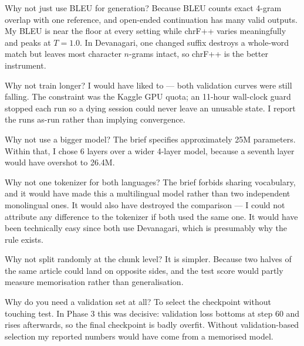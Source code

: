 \documentclass[11pt]{report}
\begin{document}
\begin{qabox}{Why not just use BLEU for generation?}
Because BLEU counts exact 4-gram overlap with one reference, and open-ended
continuation has many valid outputs. My BLEU is near the floor at every setting
while chrF++ varies meaningfully and peaks at $T=1.0$. In Devanagari, one
changed suffix destroys a whole-word match but leaves most character $n$-grams
intact, so chrF++ is the better instrument.
\end{qabox}

\begin{qabox}{Why not train longer?}
I would have liked to --- both validation curves were still falling. The
constraint was the Kaggle GPU quota; an 11-hour wall-clock guard stopped each
run so a dying session could never leave an unusable state. I report the runs
as-run rather than implying convergence.
\end{qabox}

\begin{qabox}{Why not use a bigger model?}
The brief specifies approximately 25M parameters. Within that, I chose 6 layers
over a wider 4-layer model, because a seventh layer would have overshot to
26.4M.
\end{qabox}

\begin{qabox}{Why not one tokenizer for both languages?}
The brief forbids sharing vocabulary, and it would have made this a multilingual
model rather than two independent monolingual ones. It would also have
destroyed the comparison --- I could not attribute any difference to the
tokenizer if both used the same one. It would have been technically easy since
both use Devanagari, which is presumably why the rule exists.
\end{qabox}

\begin{qabox}{Why not split randomly at the chunk level? It is simpler.}
Because two halves of the same article could land on opposite sides, and the
test score would partly measure memorisation rather than generalisation.
\end{qabox}

\begin{qabox}{Why do you need a validation set at all?}
To select the checkpoint without touching test. In Phase 3 this was decisive:
validation loss bottoms at step 60 and rises afterwards, so the final
checkpoint is badly overfit. Without validation-based selection my reported
numbers would have come from a memorised model.
\end{qabox}
\end{document}
